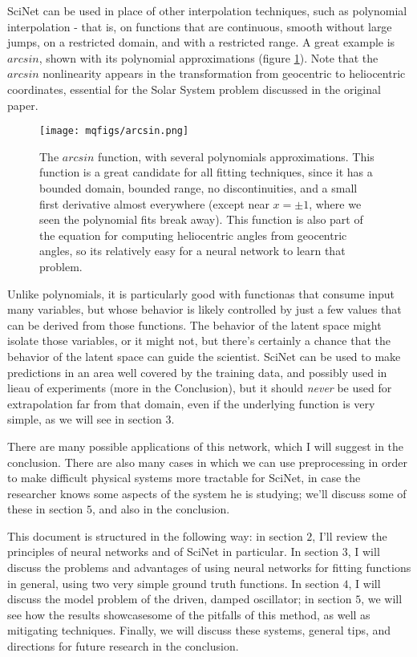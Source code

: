 \documentclass[aps,prl,preprint,groupedaddress]{revtex4-1}
\begin{document}
SciNet can be used in place of other interpolation techniques, such as polynomial interpolation - that is, on functions that are continuous, smooth without large jumps, on a restricted domain, and with a restricted range. A great example is $arcsin$, shown with its polynomial approximations (figure \ref{arcsin}). Note that the $arcsin$ nonlinearity appears in the transformation from geocentric to heliocentric coordinates, essential for the Solar System problem discussed in the original paper.

\begin{figure}[h]
   \centering
   \texttt{[image: mqfigs/arcsin.png]}
   \caption{\label{arcsin} The $arcsin$ function, with several polynomials approximations. This function is a great candidate for all fitting techniques, since it has a bounded domain, bounded range, no discontinuities, and a small first derivative almost everywhere (except near $x = \pm 1$, where we seen the polynomial fits break away). This function is also part of the equation for computing heliocentric angles from geocentric angles, so its relatively easy for a neural network to learn that problem.}
\end{figure}

Unlike polynomials, it is particularly good with functionas that consume input many variables, but whose behavior is likely controlled by just a few values that can be derived from those functions. The behavior of the latent space might isolate those variables, or it might not, but there's certainly a chance that the behavior of the latent space can guide the scientist. SciNet can be used to make predictions in an area well covered by the training data, and possibly used in lieau of experiments (more in the Conclusion), but it should \emph{never} be used for extrapolation far from that domain, even if the underlying function is very simple, as we will see in section $3$.

There are many possible applications of this network, which I will suggest in the conclusion. There are also many cases in which we can use preprocessing in order to make difficult physical systems more tractable for SciNet, in case the researcher knows some aspects of the system he is studying; we'll discuss some of these in section $5$, and also in the conclusion.

This document is structured in the following way: in section $2$, I'll review the principles of neural networks and of SciNet in particular. In section $3$, I will discuss the problems and advantages of using neural networks for fitting functions in general, using two very simple ground truth functions. In section $4$, I will discuss the model problem of the driven, damped oscillator; in section $5$, we will see how the results showcasesome of the pitfalls of this method, as well as mitigating techniques. Finally, we will discuss these systems, general tips, and directions for future research in the conclusion.
\end{document}
